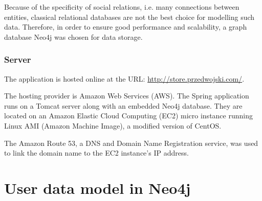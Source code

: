 \documentclass[12pt]{report}
\begin{document}
Because of the specificity of social relations, i.e. many connections between entities, classical relational databases are not the best choice for modelling such data. Therefore, in order to ensure good performance and scalability, a graph database Neo4j \cite{neo4j} was chosen for data storage.

\subsubsection{Server}

The application is hosted online at the URL: \url{http://store.przedwojski.com/}. 

The hosting provider is Amazon Web Services (AWS). The Spring application runs on a Tomcat server along with an embedded Neo4j database. They are located on an Amazon Elastic Cloud Computing (EC2) micro instance running Linux AMI (Amazon Machine Image), a modified version of CentOS.

The Amazon Route 53, a DNS and Domain Name Registration service, was used to link the domain name to the EC2 instance's IP address.








\section{User data model in Neo4j}
\end{document}
